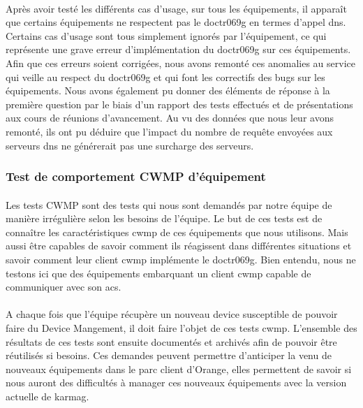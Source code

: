 \documentclass[12pt,a4paper]{report}
\begin{document}
\paragraph*{}Après avoir testé les différents cas d’usage, sur tous les équipements, il apparaît que certains équipements ne respectent pas le \gls{doctr069g} en termes d'appel \gls{dns}. Certains cas d’usage sont tous simplement ignorés par l'équipement, ce qui représente une grave
erreur d'implémentation du \gls{doctr069g} sur ces équipements. Afin que ces erreurs soient corrigées, nous avons remonté ces anomalies au service qui veille au respect du \gls{doctr069g} et qui font les correctifs des bugs sur les équipements. Nous avons également pu donner des éléments de réponse à la première question par le biais d’un rapport des tests effectués et de présentations aux cours de réunions d'avancement. Au vu des données que nous leur avons remonté, ils ont pu déduire que l'impact du nombre de requête envoyées aux serveurs \gls{dns} ne générerait pas une surcharge des serveurs. \\
\subsubsection{Test de comportement CWMP d'équipement}
\paragraph*{}Les tests CWMP sont des tests qui nous sont demandés par notre équipe de manière irrégulière selon les besoins de l'équipe. Le but de ces tests est de connaître les caractéristiques \gls{cwmp} de ces équipements que nous utilisons. Mais aussi être capables de savoir comment ils réagissent dans différentes situations et savoir comment leur client \gls{cwmp} implémente le \gls{doctr069g}. Bien entendu, nous ne testons ici que des équipements embarquant un client \gls{cwmp} capable de communiquer avec son \gls{acs}.
\paragraph*{}A chaque fois que l’équipe récupère un nouveau device susceptible de pouvoir faire du Device Mangement, il doit faire l’objet de ces tests \gls{cwmp}. L’ensemble des résultats de ces tests sont ensuite documentés et archivés afin de pouvoir être réutilisés si besoins. Ces demandes peuvent permettre d'anticiper la venu de nouveaux équipements dans le parc client d'Orange, elles permettent de savoir si nous auront des difficultés à manager ces nouveaux équipements avec la version actuelle de \gls{karmag}. 
\end{document}
